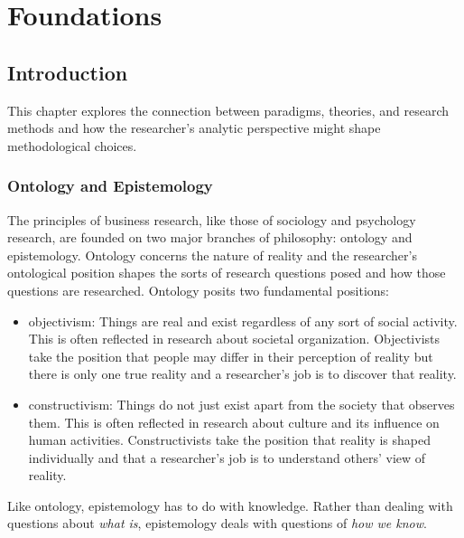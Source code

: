 \chapter{Foundations}\label{02:foundations}

\section{Introduction}

This chapter explores the connection between paradigms, theories, and research methods and how the researcher's analytic perspective might shape methodological choices. 

\subsection{Ontology and Epistemology}\label{02:ontology}

The principles of business research, like those of sociology and psychology research, are founded on two major branches of philosophy: \gls{ontology} and \gls{epistemology}. Ontology concerns the nature of reality and the researcher's ontological position shapes the sorts of research questions posed and how those questions are researched. Ontology posits two fundamental positions:

\begin{itemize}
	\item \Gls{objectivism}: Things are real and exist regardless of any sort of social activity. This is often reflected in research about societal organization. Objectivists take the position that people may differ in their perception of reality but there is only one true reality and a researcher's job is to discover that reality.

	\item \Gls{constructivism}: Things do not just exist apart from the society that observes them. This is often reflected in research about culture and its influence on human activities. Constructivists take the position that reality is shaped individually and that a researcher's job is to understand others' view of reality. 
\end{itemize}

Like ontology, epistemology has to do with knowledge. Rather than dealing with questions about \textit{what is}, epistemology deals with questions of \textit{how we know}. 

